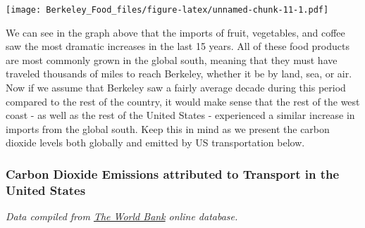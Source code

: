 \documentclass[]{article}
\newenvironment{Shaded}{\begin{snugshade}}{\end{snugshade}}
\newcommand{\KeywordTok}[1]{\textcolor[rgb]{0.13,0.29,0.53}{\textbf{#1}}}
\newcommand{\DataTypeTok}[1]{\textcolor[rgb]{0.13,0.29,0.53}{#1}}
\newcommand{\DecValTok}[1]{\textcolor[rgb]{0.00,0.00,0.81}{#1}}
\newcommand{\StringTok}[1]{\textcolor[rgb]{0.31,0.60,0.02}{#1}}
\newcommand{\OtherTok}[1]{\textcolor[rgb]{0.56,0.35,0.01}{#1}}
\newcommand{\OperatorTok}[1]{\textcolor[rgb]{0.81,0.36,0.00}{\textbf{#1}}}
\newcommand{\NormalTok}[1]{#1}
\begin{document}
\texttt{[image: Berkeley\_Food\_files/figure-latex/unnamed-chunk-11-1.pdf]}

We can see in the graph above that the imports of fruit, vegetables, and
coffee saw the most dramatic increases in the last 15 years. All of
these food products are most commonly grown in the global south, meaning
that they must have traveled thousands of miles to reach Berkeley,
whether it be by land, sea, or air. Now if we assume that Berkeley saw a
fairly average decade during this period compared to the rest of the
country, it would make sense that the rest of the west coast - as well
as the rest of the United States - experienced a similar increase in
imports from the global south. Keep this in mind as we present the
carbon dioxide levels both globally and emitted by US transportation
below.

\subsubsection{Carbon Dioxide Emissions attributed to Transport in the
United
States}\label{carbon-dioxide-emissions-attributed-to-transport-in-the-united-states}

\emph{Data compiled from
\href{https://data.worldbank.org/indicator/EN.CO2.TRAN.ZS?end=2014\&locations=US\&start=1999}{The
World Bank} online database.}

\begin{Shaded}
\end{Shaded}
\end{document}
